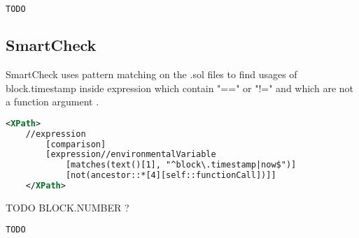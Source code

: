 \begin{lstlisting}[language=bash, caption="Oyente output for the time lock contract"]
    TODO
\end{lstlisting}


\subsection{SmartCheck}
SmartCheck uses pattern matching on the .sol files to find usages of block.timestamp inside expression which contain "==" or "!=" and which are not a function argument \cite{smartcheck}.
\begin{lstlisting}[language=xml]
    <XPath>
    //expression
        [comparison]
        [expression//environmentalVariable
            [matches(text()[1], "^block\.timestamp|now$")]
            [not(ancestor::*[4][self::functionCall])]]
    </XPath>
\end{lstlisting}

TODO BLOCK.NUMBER ?

\begin{lstlisting}[language=bash, caption="Oyente output for the time lock contract"]
    TODO
\end{lstlisting}